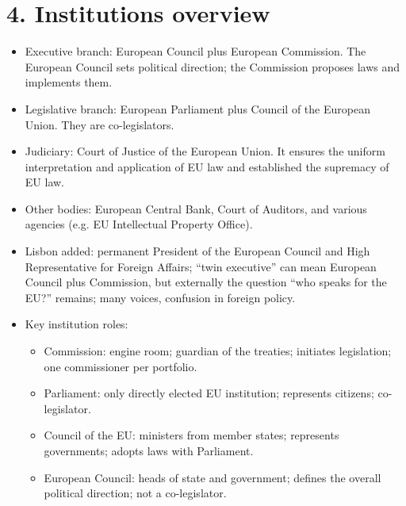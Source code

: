 \documentclass[10pt,a4paper]{article}
\begin{document}
\section*{4. Institutions overview}
\begin{itemize}
\item Executive branch: European Council plus European Commission. The European Council sets political direction; the Commission proposes laws and implements them.
\item Legislative branch: European Parliament plus Council of the European Union. They are co-legislators.
\item Judiciary: Court of Justice of the European Union. It ensures the uniform interpretation and application of EU law and established the supremacy of EU law.
\item Other bodies: European Central Bank, Court of Auditors, and various agencies (e.g. EU Intellectual Property Office).
\item Lisbon added: permanent President of the European Council and High Representative for Foreign Affairs; ``twin executive'' can mean European Council plus Commission, but externally the question ``who speaks for the EU?'' remains; many voices, confusion in foreign policy.
\item Key institution roles:
  \begin{itemize}
  \item Commission: engine room; guardian of the treaties; initiates legislation; one commissioner per portfolio.
  \item Parliament: only directly elected EU institution; represents citizens; co-legislator.
  \item Council of the EU: ministers from member states; represents governments; adopts laws with Parliament.
  \item European Council: heads of state and government; defines the overall political direction; not a co-legislator.
  \end{itemize}
\end{itemize}
\end{document}
